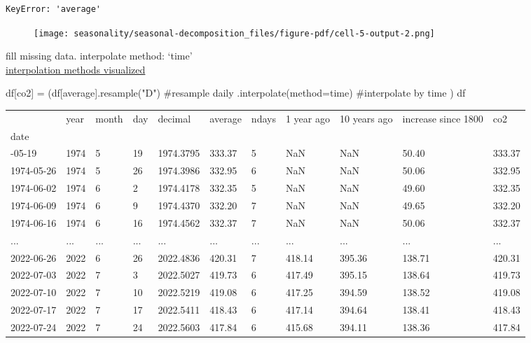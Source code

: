 \documentclass[
  letterpaper,
  DIV=11,
  numbers=noendperiod,
  oneside]{scrreprt}
\newenvironment{Shaded}{\begin{snugshade}}{\end{snugshade}}
\newcommand{\CommentTok}[1]{\textcolor[rgb]{0.37,0.37,0.37}{#1}}
\newcommand{\NormalTok}[1]{\textcolor[rgb]{0.00,0.23,0.31}{#1}}
\newcommand{\OperatorTok}[1]{\textcolor[rgb]{0.37,0.37,0.37}{#1}}
\newcommand{\StringTok}[1]{\textcolor[rgb]{0.13,0.47,0.30}{#1}}
\begin{document}
\begin{verbatim}
KeyError: 'average'
\end{verbatim}

\begin{figure}[H]

{\centering \texttt{[image: seasonality/seasonal-decomposition\_files/figure-pdf/cell-5-output-2.png]}

}

\end{figure}

fill missing data. interpolate method: `time'\\
\href{https://thepythonyouneed.com/how-to-interpolate-values-with-pandas/}{interpolation
methods visualized}

\begin{Shaded}
\begin{Highlighting}[]
\NormalTok{df[}\StringTok{\textquotesingle{}co2\textquotesingle{}}\NormalTok{] }\OperatorTok{=}\NormalTok{ (df[}\StringTok{\textquotesingle{}average\textquotesingle{}}\NormalTok{].resample(}\StringTok{"D"}\NormalTok{) }\CommentTok{\#resample daily}
\NormalTok{                          .interpolate(method}\OperatorTok{=}\StringTok{\textquotesingle{}time\textquotesingle{}}\NormalTok{) }\CommentTok{\#interpolate by time}
\NormalTok{            )}
\NormalTok{df}
\end{Highlighting}
\end{Shaded}

\begin{longtable}[]{@{}lllllllllll@{}}
\toprule\noalign{}
& year & month & day & decimal & average & ndays & 1 year ago & 10 years
ago & increase since 1800 & co2 \\
date & & & & & & & & & & \\
\midrule\noalign{}
\endhead
\bottomrule\noalign{}
\endlastfoot
1974-05-19 & 1974 & 5 & 19 & 1974.3795 & 333.37 & 5 & NaN & NaN & 50.40
& 333.37 \\
1974-05-26 & 1974 & 5 & 26 & 1974.3986 & 332.95 & 6 & NaN & NaN & 50.06
& 332.95 \\
1974-06-02 & 1974 & 6 & 2 & 1974.4178 & 332.35 & 5 & NaN & NaN & 49.60 &
332.35 \\
1974-06-09 & 1974 & 6 & 9 & 1974.4370 & 332.20 & 7 & NaN & NaN & 49.65 &
332.20 \\
1974-06-16 & 1974 & 6 & 16 & 1974.4562 & 332.37 & 7 & NaN & NaN & 50.06
& 332.37 \\
... & ... & ... & ... & ... & ... & ... & ... & ... & ... & ... \\
2022-06-26 & 2022 & 6 & 26 & 2022.4836 & 420.31 & 7 & 418.14 & 395.36 &
138.71 & 420.31 \\
2022-07-03 & 2022 & 7 & 3 & 2022.5027 & 419.73 & 6 & 417.49 & 395.15 &
138.64 & 419.73 \\
2022-07-10 & 2022 & 7 & 10 & 2022.5219 & 419.08 & 6 & 417.25 & 394.59 &
138.52 & 419.08 \\
2022-07-17 & 2022 & 7 & 17 & 2022.5411 & 418.43 & 6 & 417.14 & 394.64 &
138.41 & 418.43 \\
2022-07-24 & 2022 & 7 & 24 & 2022.5603 & 417.84 & 6 & 415.68 & 394.11 &
138.36 & 417.84 \\
\end{longtable}
\end{document}
